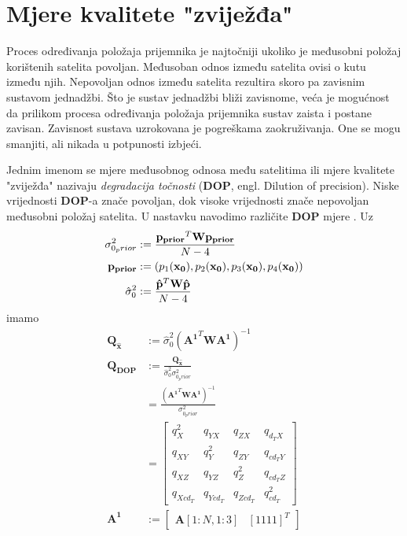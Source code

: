 \documentclass[a4paper,twoside,12pt]{memoir} %
\begin{document}
\chapter{Mjere kvalitete "zviježđa"}\label{appendix:DOP}
Proces određivanja položaja prijemnika je najtočniji ukoliko je međusobni položaj korištenih satelita povoljan.
Međusoban odnos između satelita ovisi o kutu između njih.
Nepovoljan odnos između satelita rezultira skoro pa zavisnim sustavom jednadžbi. 
Što je sustav jednadžbi bliži zavisnome, veća je mogućnost da prilikom procesa određivanja položaja prijemnika sustav zaista i postane zavisan. Zavisnost sustava uzrokovana je pogreškama zaokruživanja. One se mogu smanjiti, ali nikada u potpunosti izbjeći.

Jednim imenom se mjere međusobnog odnosa među satelitima ili mjere kvalitete "zviježđa" nazivaju \textit{degradacija točnosti} (\textbf{DOP}, engl. Dilution of precision).
Niske vrijednosti \textbf{DOP}-a znače povoljan, dok 
visoke vrijednosti znače nepovoljan međusobni položaj satelita.
U nastavku navodimo različite \textbf{DOP} mjere \cite{svd_str15}.
Uz%
\begin{align}
\sigma_{0_prior}^2 & := \frac{\mathbf{p_{prior}}^T \mathbf{W}\mathbf{p_{prior}}}{N-4}\\
\mathbf{p_{prior}} & := (p_1(\mathbf{x_0}),p_2(\mathbf{x_0}),p_3(\mathbf{x_0}),p_4(\mathbf{x_0})) \notag \\
\hat{\sigma}_0^2 & := \frac{\mathbf{\hat{p}}^T \mathbf{W}\mathbf{\hat{p}}}{N - 4}
\end{align}
imamo
\begin{align}
\mathbf{Q_{\hat{x}}} & := \hat{\sigma}_0^2(\mathbf{A^1}^T\mathbf{W}\mathbf{A^1})^{-1} \\
\mathbf{Q_{DOP}} & := \frac{\mathbf{Q_{\hat{x}}}}{\hat{\sigma}_0^2 \sigma_{0_prior}^2} \\
& = \frac{(\mathbf{A^1}^T\mathbf{W}\mathbf{A^1})^{-1}}{\sigma_{0_prior}^2} \\
& = \begin{bmatrix}
q_X^2 & q_{YX} & q_{ZX} & q_{d_TX} \\
q_{XY} & q_Y^2 & q_{ZY} & q_{cd_TY} \\
q_{XZ} & q_{YZ} & q_Z^2 & q_{cd_TZ} \\
q_{Xcd_T} & q_{Ycd_T} & q_{Zcd_T} & q_{cd_T}^2 
\end{bmatrix}\\
\mathbf{A^1} & := \begin{bmatrix}
\mathbf{A}[1:N,1:3] & [1 1 1 1]^T
\end{bmatrix}
\end{align}
\end{document}
